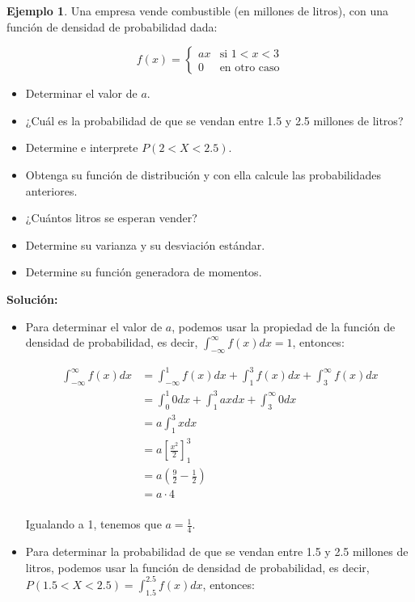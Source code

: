 \documentclass{article}
\theoremstyle{definition}
\newtheorem{example}[definition]{Ejemplo}
\theoremstyle{plain}
\theoremstyle{remark}
\begin{document}
\begin{example}
Una empresa vende combustible (en millones de litros), con una función de densidad de probabilidad dada:

\[
f(x) = \begin{cases}
ax & \text{si } 1 < x < 3 \\
0 & \text{en otro caso}
\end{cases}
\]

\begin{itemize}
\item Determinar el valor de $a$.
\item ¿Cuál es la probabilidad de que se vendan entre 1.5 y 2.5 millones de litros?
\item Determine e interprete $P(2 < X < 2.5)$.
\item Obtenga su función de distribución y con ella calcule las probabilidades anteriores.
\item ¿Cuántos litros se esperan vender?
\item Determine su varianza y su desviación estándar.
\item Determine su función generadora de momentos.
\end{itemize}

\textbf{Solución:}

\begin{itemize}
\item Para determinar el valor de $a$, podemos usar la propiedad de la función de densidad de probabilidad, es decir, $\int_{-\infty}^{\infty} f(x) dx = 1$, entonces:

\begin{align*}
\int_{-\infty}^{\infty} f(x) dx &= \int_{-\infty}^{1} f(x) dx + \int_{1}^{3} f(x) dx + \int_{3}^{\infty} f(x) dx \\
&= \int_{0}^{1} 0 dx + \int_{1}^{3} ax dx + \int_{3}^{\infty} 0 dx \\
&= a \int_{1}^{3} x dx \\
&= a \left[ \frac{x^2}{2} \right]_{1}^{3} \\
&= a \left( \frac{9}{2} - \frac{1}{2} \right) \\
&= a \cdot 4 \\
\end{align*}

Igualando a 1, tenemos que $a = \frac{1}{4}$.

\item Para determinar la probabilidad de que se vendan entre 1.5 y 2.5 millones de litros, podemos usar la función de densidad de probabilidad, es decir, $P(1.5 < X < 2.5) = \int_{1.5}^{2.5} f(x) dx$, entonces:


\end{itemize}
\end{example}
\end{document}
